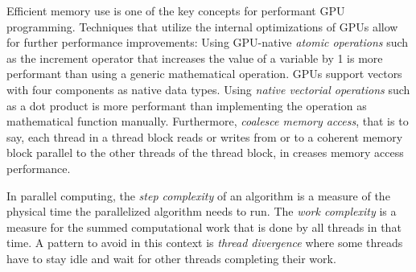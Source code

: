 Efficient memory use is one of the key concepts for performant GPU programming. Techniques that utilize the internal optimizations of GPUs allow for further performance improvements: Using GPU-native \textit{atomic operations} such as the increment operator that increases the value of a variable by 1 is more performant than using a generic mathematical operation. GPUs support vectors with four components as native data types. Using \textit{native vectorial operations} such as a dot product is more performant than implementing the operation as mathematical function manually. Furthermore, \textit{coalesce memory access}, that is to say, each thread in a thread block reads or writes from or to a coherent memory block parallel to the other threads of the thread block, in creases memory access performance. \cite{cudacourse}

In parallel computing, the \textit{step complexity} of an algorithm is a measure of the physical time the parallelized algorithm needs to run. The \textit{work complexity} is a measure for the summed computational work that is done by all threads in that time. A pattern to avoid in this context is \textit{thread divergence} where some threads have to stay idle and wait for other threads completing their work. \cite{cudacourse}

